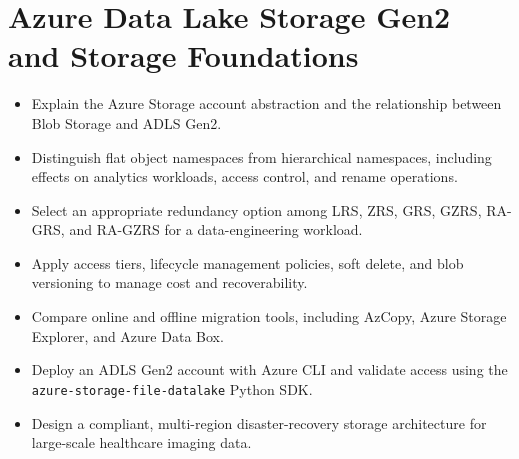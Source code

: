 \chapter{Azure Data Lake Storage Gen2 and Storage Foundations}
%
\begin{objectives}
\begin{itemize}
    \item Explain the Azure Storage account abstraction and the relationship between Blob Storage and ADLS Gen2.
    \item Distinguish flat object namespaces from hierarchical namespaces, including effects on analytics workloads, access control, and rename operations.
    \item Select an appropriate redundancy option among LRS, ZRS, GRS, GZRS, RA-GRS, and RA-GZRS for a data-engineering workload.
    \item Apply access tiers, lifecycle management policies, soft delete, and blob versioning to manage cost and recoverability.
    \item Compare online and offline migration tools, including AzCopy, Azure Storage Explorer, and Azure Data Box.
    \item Deploy an ADLS Gen2 account with Azure CLI and validate access using the \texttt{azure-storage-file-datalake} Python SDK.
    \item Design a compliant, multi-region disaster-recovery storage architecture for large-scale healthcare imaging data.
\end{itemize}
\end{objectives}

